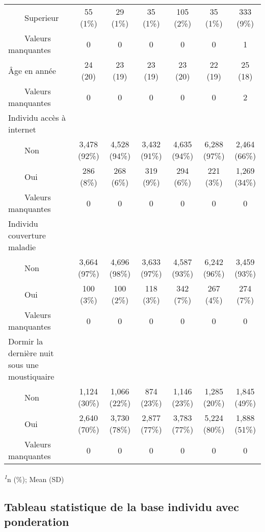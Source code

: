 \documentclass[
]{article}
\begin{document}
\begin{table}[!t]
\begin{tabular*}{\linewidth}{@{\extracolsep{\fill}}lcccccc}
    Superieur & 55 (1\%) & 29 (1\%) & 35 (1\%) & 105 (2\%) & 35 (1\%) & 333 (9\%) \\ 
    Valeurs manquantes & 0 & 0 & 0 & 0 & 0 & 1 \\ 
Âge en année & 24 (20) & 23 (19) & 23 (19) & 23 (20) & 22 (19) & 25 (18) \\ 
    Valeurs manquantes & 0 & 0 & 0 & 0 & 0 & 2 \\ 
Individu accès à internet &  &  &  &  &  &  \\ 
    Non & 3,478 (92\%) & 4,528 (94\%) & 3,432 (91\%) & 4,635 (94\%) & 6,288 (97\%) & 2,464 (66\%) \\ 
    Oui & 286 (8\%) & 268 (6\%) & 319 (9\%) & 294 (6\%) & 221 (3\%) & 1,269 (34\%) \\ 
    Valeurs manquantes & 0 & 0 & 0 & 0 & 0 & 0 \\ 
Individu couverture maladie &  &  &  &  &  &  \\ 
    Non & 3,664 (97\%) & 4,696 (98\%) & 3,633 (97\%) & 4,587 (93\%) & 6,242 (96\%) & 3,459 (93\%) \\ 
    Oui & 100 (3\%) & 100 (2\%) & 118 (3\%) & 342 (7\%) & 267 (4\%) & 274 (7\%) \\ 
    Valeurs manquantes & 0 & 0 & 0 & 0 & 0 & 0 \\ 
Dormir la dernière nuit sous une moustiquaire &  &  &  &  &  &  \\ 
    Non & 1,124 (30\%) & 1,066 (22\%) & 874 (23\%) & 1,146 (23\%) & 1,285 (20\%) & 1,845 (49\%) \\ 
    Oui & 2,640 (70\%) & 3,730 (78\%) & 2,877 (77\%) & 3,783 (77\%) & 5,224 (80\%) & 1,888 (51\%) \\ 
    Valeurs manquantes & 0 & 0 & 0 & 0 & 0 & 0 \\ 
\bottomrule
\end{tabular*}
\begin{minipage}{\linewidth}
\textsuperscript{\textit{1}}n (\%); Mean (SD)\\
\end{minipage}
\end{table}

\subsection{Tableau statistique de la base individu avec
ponderation}\label{tableau-statistique-de-la-base-individu-avec-ponderation}
\end{document}
